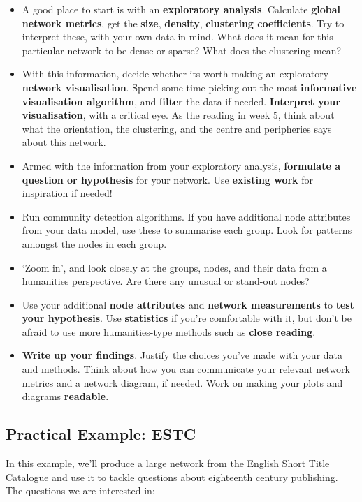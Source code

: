 \documentclass[
]{book}
\begin{document}
\begin{itemize}
\item
  A good place to start is with an \textbf{exploratory analysis}. Calculate \textbf{global network metrics}, get the \textbf{size}, \textbf{density}, \textbf{clustering coefficients}. Try to interpret these, with your own data in mind. What does it mean for this particular network to be dense or sparse? What does the clustering mean?
\item
  With this information, decide whether its worth making an exploratory \textbf{network visualisation}. Spend some time picking out the most \textbf{informative visualisation algorithm}, and \textbf{filter} the data if needed. \textbf{Interpret your visualisation}, with a critical eye. As the reading in week 5, think about what the orientation, the clustering, and the centre and peripheries says about this network.
\item
  Armed with the information from your exploratory analysis, \textbf{formulate a question or hypothesis} for your network. Use \textbf{existing work} for inspiration if needed!
\item
  Run community detection algorithms. If you have additional node attributes from your data model, use these to summarise each group. Look for patterns amongst the nodes in each group.
\item
  `Zoom in', and look closely at the groups, nodes, and their data from a humanities perspective. Are there any unusual or stand-out nodes?
\item
  Use your additional \textbf{node attributes} and \textbf{network measurements} to \textbf{test your hypothesis}. Use \textbf{statistics} if you're comfortable with it, but don't be afraid to use more humanities-type methods such as \textbf{close reading}.
\item
  \textbf{Write up your findings}. Justify the choices you've made with your data and methods. Think about how you can communicate your relevant network metrics and a network diagram, if needed. Work on making your plots and diagrams \textbf{readable}.
\end{itemize}

\hypertarget{practical-example-estc}{%
\subsection{Practical Example: ESTC}\label{practical-example-estc}}

In this example, we'll produce a large network from the English Short Title Catalogue and use it to tackle questions about eighteenth century publishing. The questions we are interested in:
\end{document}
